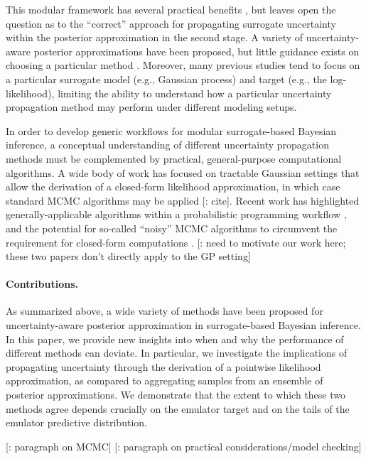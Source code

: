 \documentclass[12pt]{article}
\begin{document}
This modular framework 
has several practical benefits \citep{modularization,PlummerCut}, but leaves open the 
question as to the ``correct'' approach for propagating surrogate uncertainty within the 
posterior approximation in the second stage. A variety of uncertainty-aware posterior 
approximations have been proposed, but little guidance exists on choosing a particular 
method \citep{reviewPaper,BilionisBayesSurrogates,StuartTeck1,VehtariParallelGP,
BurknerSurrogate,BurknerTwoStep,FerEmulation}. Moreover, many previous studies 
tend to focus on a particular surrogate model (e.g., Gaussian process) and target 
(e.g., the log-likelihood), limiting the ability to understand how a particular 
uncertainty propagation method may perform under different modeling setups. 
 
In order to develop generic workflows for modular surrogate-based Bayesian inference, 
a conceptual understanding of different uncertainty propagation methods must 
be complemented by practical, general-purpose computational algorithms.
A wide body of work has focused on tractable Gaussian settings that allow the derivation 
of a closed-form likelihood approximation, in which case standard MCMC algorithms 
may be applied [\todo: cite]. Recent work has highlighted 
generally-applicable algorithms within a probabilistic programming workflow
\citep{BurknerSurrogate}, and the potential for so-called ``noisy'' MCMC algorithms 
to circumvent the requirement for closed-form computations \citep{garegnani2021NoisyMCMC}. 
[\todo: need to motivate our work here; these two papers don't directly apply to the GP setting]

\paragraph{Contributions.}
As summarized above, a wide variety of methods have been proposed for 
uncertainty-aware posterior approximation in surrogate-based Bayesian inference. 
In this paper, we provide new insights into when and why the performance of different 
methods can deviate. In particular, we investigate the implications of propagating
uncertainty through the derivation of a pointwise likelihood approximation, as compared 
to aggregating samples from an ensemble of posterior approximations. We demonstrate 
that the extent to which these two methods agree depends crucially on the emulator 
target and on the tails of the emulator predictive distribution. 

[\todo: paragraph on MCMC] [\todo: paragraph on practical considerations/model checking]
\end{document}
